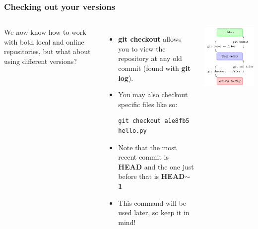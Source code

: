 \documentclass{beamer}
\begin{document}
\begin{frame}[fragile]
\frametitle{Checking out your versions}
\begin{columns}
We now know how to work with both local and online repositories, but what about using different versions?
\begin{itemize}
\item \textbf{git checkout} allows you to view the repository at any old commit (found with \textbf{git log}).
\item You may also checkout specific files like so:
        \begin{lstlisting}
git checkout a1e8fb5 hello.py
        \end{lstlisting}
\item Note that the most recent commit is \textbf{HEAD} and the one just before that is \textbf{HEAD$\mathbf{\sim}$1}
\item This command will be used later, so keep it in mind! 
\end{itemize}
\includegraphics[width=\textwidth]{basic-usage.png}
\end{columns}
\end{frame}
\end{document}
